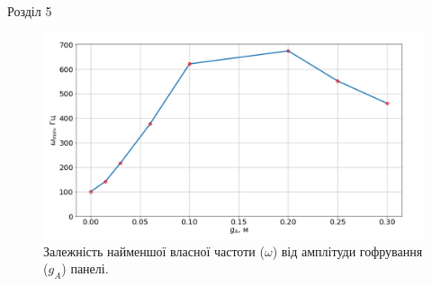 \documentclass[8pt]{beamer}
\numberwithin{figure}{section}
\numberwithin{equation}{section}
\numberwithin{table}{section}
\begin{document}
\begin{frame}{Розділ 5}
\begin{table}[h!]
\centering
{}
\caption{Залежність найменшої власної частоти ($\omega$) від амплітуди гофрування ($g_A$) панелі.}
\label{table:51}
\end{table}

\begin{figure}
	\includegraphics[scale=0.25]{pic/corrugated_ampl_linear.png}
		\caption{Залежність найменшої власної частоти ($\omega$) від амплітуди гофрування ($g_A$) панелі.}
\end{figure}
\end{frame}
\end{document}
